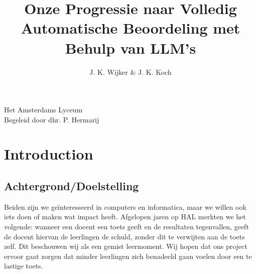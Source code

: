 \documentclass[12pt]{article}
\title{Onze Progressie naar Volledig Automatische Beoordeling met Behulp van LLM's}
\author{J. K. Wijker & J. K. Koch}
\begin{document}
\maketitle
\mbox{}
\vfill
\begin{flushright}
\large Het Amsterdams Lyceum\\
\scriptsize Begeleid door dhr. P. Hermarij \normalsize
\end{flushright}
\thispagestyle{empty}
\pagebreak
\tableofcontents

\pagebreak
\section{Introduction}
\begin{multicols}{2}
\subsection{Achtergrond/Doelstelling} 

Beiden zijn we geïnteresseerd in computers en informatica, maar we willen ook iets doen of maken wat impact heeft. Afgelopen jaren op HAL merkten we het volgende: wanneer een docent een toets geeft en de resultaten tegenvallen, geeft de docent hiervan de leerlingen de schuld, zonder dit te verwijten aan de toets zelf. Dit beschouwen wij als een gemist leermoment. Wij hopen dat ons project ervoor gaat zorgen dat minder leerlingen zich benadeeld gaan voelen door een te lastige toets. 



\end{multicols}
\end{document}
